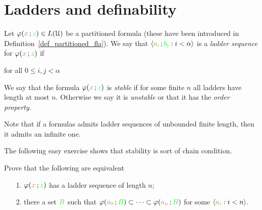 \documentclass[creche.tex]{subfiles}
\begin{document}
\section{Ladders and definability}



Let $\varphi({\color{brown} x}\,;{\color{green} z})\in L(\EuScript U)$ be a partitioned formula (these have been introduced in Definition~\ref{def_partitioned_fla}).
We say that $\langle{\color{brown}a_i}\,;{\color{green} b_i} : i<\alpha\rangle$ is a \emph{ladder sequence\/} for $\varphi({\color{brown} x}\,;{\color{green} z})$ if 

\hfill for all $0\le i,j<\alpha$

We say that the formula $\varphi({\color{brown} x}\,;{\color{green} z})$ is \emph{stable\/} if for some finite $n$ all ladders have length at most $n$. Otherwise we say it is \emph{unstable} or that it has the \emph{order property}.

Note that if a formulas admits ladder sequences of unbounded finite length, then it admits an infinite one.

The following easy exercise shows that stability is sort of chain condition.

\begin{exercise}
   Prove that the following are equivalent
   \begin{itemize}
   \item[1.]  $\varphi({\color{brown} x}\,;{\color{green} z})$ has a ladder sequence of length $n$;
   \item[2.] there a set ${\color{green} B}$ such that $\varphi({\color{brown} a_0}\,;{\color{green} B})\subset\dots\subset\varphi({\color{brown} a_n}\,;{\color{green} B})$ for some $\langle{\color{brown}a_i} : i<n\rangle$.\QED
   \end{itemize}
\end{exercise}



\end{document}
